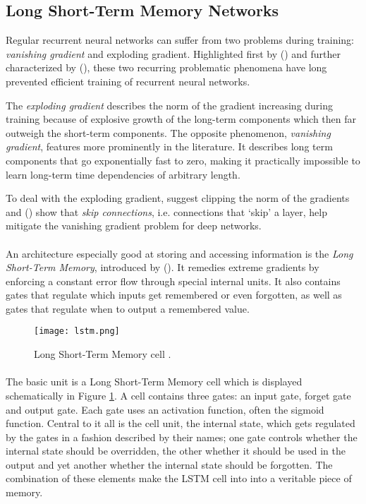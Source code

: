 \subsection{Long Short-Term Memory Networks}
\label{sec:lstm}
Regular recurrent neural networks can suffer from two problems during training:
\textit{vanishing gradient} and {exploding gradient}.
Highlighted first by
\citeauthor{hochreiter1991untersuchungen} (\citeyear{hochreiter1991untersuchungen})
and further characterized by
\citeauthor{bengio1994} (\citeyear{bengio1994}),
these two recurring problematic phenomena have long prevented
efficient training of recurrent neural networks.

The \textit{exploding gradient} describes the norm of the gradient
increasing during training
because of explosive growth of the long-term components
which then far outweigh the short-term components.
The opposite phenomenon, \textit{vanishing gradient},
features more prominently in the literature.
It describes long term components that go exponentially fast to zero,
making it practically impossible to learn
long-term time dependencies of arbitrary length.

To deal with the exploding gradient,
\parencite{Pascanu2012}
suggest clipping the norm of the gradients
and
\citeauthor{Graves2013} (\citeyear{Graves2013})
show that \textit{skip connections},
i.e. connections that `skip' a layer,
help mitigate the vanishing gradient problem
for deep networks.

\paragraph{}
An architecture especially good at storing and accessing information
is the \textit{Long Short-Term Memory},
introduced by \citeauthor{Hochreiter1997} (\citeyear{Hochreiter1997}).
It remedies extreme gradients
by enforcing a constant error flow through special internal units.
It also contains gates that regulate
which inputs get remembered or even forgotten,
as well as gates that regulate when to output a remembered value.

\begin{figure}[htpb]
  \centering
  \texttt{[image: lstm.png]}
  \caption[Long Short-Term Memory]{
    Long Short-Term Memory cell
  \parencite{Graves2013}.
  }
  \label{fig:lstm}
\end{figure}

\paragraph{}
The basic unit is a Long Short-Term Memory cell
which is displayed schematically in Figure \ref{fig:lstm}.
A cell contains three gates:
an input gate, forget gate and output gate.
Each gate uses an activation function,
often the sigmoid function.
Central to it all is the cell unit, the internal state,
which gets regulated by the gates
in a fashion described by their names;
one gate controls whether the internal state should be overridden,
the other whether it should be used in the output
and yet another whether the internal state should be forgotten.
The combination of these elements make the LSTM cell into
into a veritable piece of memory.

